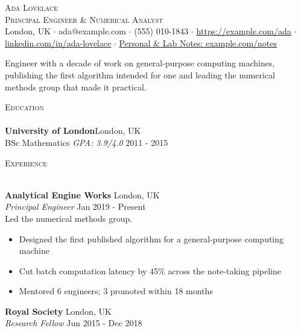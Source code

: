 \documentclass[a4paper]{article}
\newcommand{\lineunder} {
    \vspace*{-8pt} \\
    \hspace*{-18pt} \hrulefill \\
}
\newcommand{\header} [1] {
    {\hspace*{-18pt}\vspace*{3pt} \textsc{#1}}
    \vspace*{-3pt} \lineunder
}
\begin{document}
    \vspace*{-40pt}

      \vspace*{-10pt}
      \begin{center}
        {\Huge \scshape {Ada Lovelace}}\\
  {\large \scshape Principal Engineer \& Numerical Analyst}\\
  London, UK $\cdot$ ada@example.com $\cdot$ (555) 010-1843 $\cdot$ \href{https://example.com/ada}{https://example.\allowbreak{}com/\allowbreak{}ada} $\cdot$ \href{https://linkedin.com/in/ada-lovelace}{linkedin.\allowbreak{}com/\allowbreak{}in/\allowbreak{}ada-\allowbreak{}lovelace} $\cdot$ \href{https://example.com/notes}{Personal \& Lab Notes: example.\allowbreak{}com/\allowbreak{}notes}\\
      \end{center}
      \vspace{-2mm}
Engineer with a decade of work on general-purpose computing machines, publishing the first algorithm intended for one and leading the numerical methods group that made it practical.
\vspace{2mm}

      \header{Education}
      \textbf{University of London}\hfill London, UK\\
BSc Mathematics \textit{GPA: 3.9/4.0} \hfill 2011 - 2015\\
\vspace{2mm}

      \header{Experience}
      \vspace{1mm}

      \textbf{Analytical Engine Works} \hfill London, UK\\
          \textit{Principal Engineer} \hfill Jan 2019 - Present\\
          Led the numerical methods group.\\
          \vspace{-1mm}
\begin{itemize} \itemsep 2pt
  \item Designed the first published algorithm for a general-purpose computing machine
  \item Cut batch computation latency by 45\% across the note-taking pipeline
  \item Mentored 6 engineers; 3 promoted within 18 months
\end{itemize}
      \textbf{Royal Society} \hfill London, UK\\
          \textit{Research Fellow} \hfill Jun 2015 - Dec 2018\\
          
\end{document}
